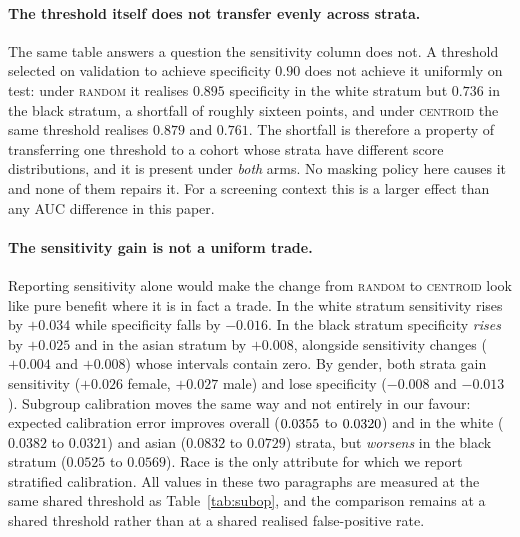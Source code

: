 \documentclass{article}
\newcommand{\ArmBest}{\textsc{centroid}}
\begin{document}
\paragraph{The threshold itself does not transfer evenly across strata.} The
same table answers a question the sensitivity column does not. A threshold
selected on validation to achieve specificity $0.90$ does not achieve it
uniformly on test: under \textsc{random} it realises $0.895$ specificity in the
white stratum but $0.736$ in the black stratum, a shortfall of roughly sixteen
points, and under \ArmBest{} the same threshold realises $0.879$ and $0.761$.
The shortfall is therefore a property of transferring one threshold to a cohort
whose strata have different score distributions, and it is present under
\emph{both} arms. No masking policy here causes it and none of them repairs it.
For a screening context this is a larger effect than any AUC difference in this
paper.

\paragraph{The sensitivity gain is not a uniform trade.} Reporting sensitivity
alone would make the change from \textsc{random} to \ArmBest{} look like pure
benefit where it is in fact a trade. In the white stratum sensitivity rises by
$+0.034$ while specificity falls by $-0.016$. In the black stratum specificity
\emph{rises} by $+0.025$ and in the asian stratum by $+0.008$, alongside
sensitivity changes ($+0.004$ and $+0.008$) whose intervals contain zero. By
gender, both strata gain sensitivity ($+0.026$ female, $+0.027$ male) and lose
specificity ($-0.008$ and $-0.013$). Subgroup calibration moves the same way and
not entirely in our favour: expected calibration error improves overall
($0.0355$ to $0.0320$) and in the white ($0.0382$ to $0.0321$) and asian
($0.0832$ to $0.0729$) strata, but \emph{worsens} in the black stratum
($0.0525$ to $0.0569$). Race is the only attribute for which we report
stratified calibration. All values in these two paragraphs are measured at the
same shared threshold as Table~\ref{tab:subop}, and the comparison remains at a
shared threshold rather than at a shared realised false-positive rate.

\begin{table}[h]
\centering
\caption{Change in sensitivity from \textsc{random} to \ArmBest{} at one shared
validation-selected threshold, by stratum. The five contrasts form one
exploratory family. Reported CIs are 95\% single-step max-$|t|$ simultaneous
intervals from \Nboot{} paired positive-subject resamples shared across both
fixed heads and all five overlapping race and gender strata, with heads and
threshold fixed (family-wise $\alpha=0.05$). White,
female and male remain above zero after adjustment. Epoch 100.}
\label{tab:subop}
\small

\end{table}
\end{document}
